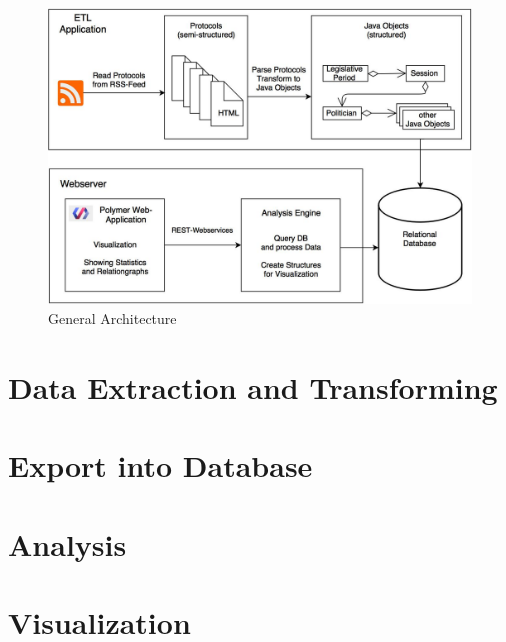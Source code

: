 \begin{figure}
	\centering
	\includegraphics[width=\textwidth]{imgs/overall_architecture}
	\caption{General Architecture}
	\label{fig:general_architecture}
\end{figure}

\section{Data Extraction and Transforming}
\label{sec:data_extraction_transforming}

\section{Export into Database}
\label{sec:export_db}

\section{Analysis}
\label{sec:analysis}

\section{Visualization}
\label{sec:visualization}
